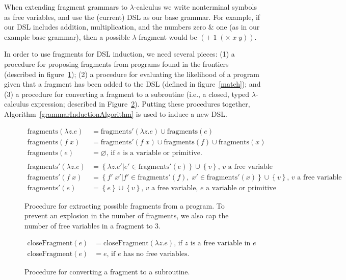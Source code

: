 \documentclass{article}
\begin{document}
When extending fragment grammars to $\lambda$-calculus we write nonterminal symbols as free variables,
and use the (current) DSL as our base grammar.
For example, if our DSL includes addition, multiplication, and the numbers zero \& one (as in our example base grammar),
then a possible  $\lambda$-fragment would be $(+ \;1\; (\times \;x\; y))$.

In order to use fragments
for DSL induction,
we need several
pieces: (1) a procedure for proposing fragments from programs found in the frontiers (described in figure~\ref{extractFragments});
(2) a procedure for evaluating
the likelihood of a program given that a fragment
has been added to the DSL (defined in figure~\ref{match});
and (3) a procedure for converting a fragment to a subroutine (i.e., a closed, typed $\lambda$-calculus expression; described in Figure~\ref{close}).
Putting these procedures together, Algorithm~\ref{grammarInductionAlgorithm}
is used to induce a new DSL.

\begin{figure}  
  \begin{minipage}[c]{\textwidth}\toprule 
    \begin{align*}
  \text{fragments}(\lambda z.e)& = \text{fragments}'(\lambda z.e)\cup \text{fragments}(e)\\
  \text{fragments}(f \; x)& = \text{fragments}'(f \; x)\cup \text{fragments}(f)\cup\text{fragments}(x)\\
  \text{fragments}(e)& = \varnothing\text{, if $e$ is a variable or primitive.}\\
  \\
  \text{fragments}'(\lambda z.e)& = \left\{\lambda z.e' | e'\in \text{fragments}'(e) \right\}\cup \left\{v \right\}\text{, $v$ a free variable}\\
  \text{fragments}'(f\; x)& = \left\{f'\; x' | f'\in \text{fragments}'(f),\;x'\in \text{fragments}'(x) \right\}\cup \left\{v \right\}\text{, $v$ a free variable}\\
    \text{fragments}'(e)& = \left\{e\right\}\cup \left\{v \right\}\text{, $v$ a free variable, $e$ a variable or primitive}
\end{align*}\bottomrule 
    \end{minipage}
\caption{Procedure for extracting possible fragments from a program. To prevent an explosion in the number of fragments, we also cap the number of free variables in a fragment to 3.}\label{extractFragments}
\end{figure}
\begin{figure}
  \toprule \begin{minipage}[c]{\textwidth}
    \begin{align*}
      \text{closeFragment}(e)& = \text{closeFragment}(\lambda z.e)\text{, if $z$ is a free variable in $e$}\\
      \text{closeFragment}(e)& = e\text{, if $e$ has no free variables.}
    \end{align*}
    \bottomrule 
  \end{minipage}
  \caption{Procedure for converting a fragment to a subroutine.}\label{close}
\end{figure}
\end{document}
